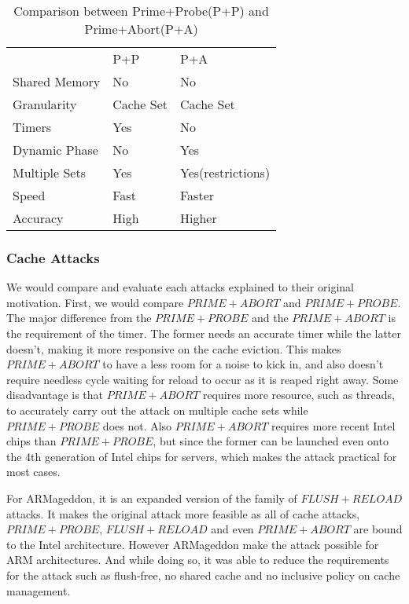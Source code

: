 \documentclass[a4paper]{article}
\begin{document}
\begin{table}[]
\centering

\label{my-label}
\begin{tabular}{lll}
                       & P+P & P+A       \\
Shared Memory & No          & No                \\
Granularity            & Cache Set   & Cache Set         \\
Timers & Yes         & No                \\
Dynamic Phase         & No          & Yes               \\
Multiple Sets  & Yes         & Yes(restrictions) \\
Speed                  & Fast        & Faster            \\
Accuracy               & High        & Higher           
\end{tabular}
\caption{Comparison between Prime+Probe(P+P) and Prime+Abort(P+A)}
\end{table}

\subsubsection{Cache Attacks}

We would compare and evaluate each attacks explained to their original motivation. First, we would compare $PRIME+ABORT$ and $PRIME+PROBE$. The major difference from the $PRIME+PROBE$ and the $PRIME+ABORT$ is the requirement of the timer. The former needs an accurate timer while the latter doesn't, making it more responsive on the cache eviction. This makes $PRIME+ABORT$ to have a less room for a noise to kick in, and also doesn't require needless cycle waiting for reload to occur as it is reaped right away. Some disadvantage is that $PRIME+ABORT$ requires more resource, such as threads, to accurately carry out the attack on multiple cache sets while $PRIME+PROBE$ does not. Also $PRIME+ABORT$ requires more recent Intel chips than $PRIME+PROBE$, but since the former can be launched even onto the 4th generation of Intel chips for servers, which makes the attack practical for most cases.
\par For ARMageddon, it is an expanded version of the family of $FLUSH+RELOAD$ attacks. It makes the original attack more feasible as all of cache attacks, $PRIME+PROBE$, $FLUSH+RELOAD$ and even $PRIME+ABORT$ are bound to the Intel architecture. However ARMageddon make the attack possible for ARM architectures. And while doing so, it was able to reduce the requirements for the attack such as flush-free, no shared cache and no inclusive policy on cache management.
\end{document}
